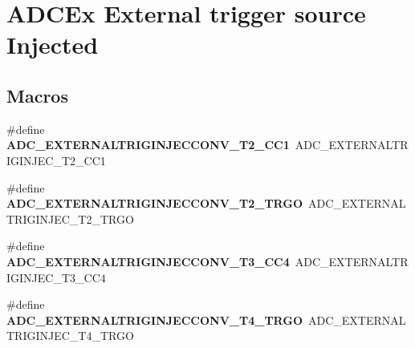 \hypertarget{group___a_d_c_ex___external__trigger__source___injected}{\section{A\-D\-C\-Ex External trigger source Injected}
\label{group___a_d_c_ex___external__trigger__source___injected}
}
\subsection*{Macros}
\begin{DoxyCompactItemize}
\item 
\hypertarget{group___a_d_c_ex___external__trigger__source___injected_gaadc7ecf196e883d7375e299dde80a8fa}{\#define {\bfseries A\-D\-C\-\_\-\-E\-X\-T\-E\-R\-N\-A\-L\-T\-R\-I\-G\-I\-N\-J\-E\-C\-C\-O\-N\-V\-\_\-\-T2\-\_\-\-C\-C1}~A\-D\-C\-\_\-\-E\-X\-T\-E\-R\-N\-A\-L\-T\-R\-I\-G\-I\-N\-J\-E\-C\-\_\-\-T2\-\_\-\-C\-C1}\label{group___a_d_c_ex___external__trigger__source___injected_gaadc7ecf196e883d7375e299dde80a8fa}

\item 
\hypertarget{group___a_d_c_ex___external__trigger__source___injected_ga5408c05ebc9a0a16c08b0be0e79506dc}{\#define {\bfseries A\-D\-C\-\_\-\-E\-X\-T\-E\-R\-N\-A\-L\-T\-R\-I\-G\-I\-N\-J\-E\-C\-C\-O\-N\-V\-\_\-\-T2\-\_\-\-T\-R\-G\-O}~A\-D\-C\-\_\-\-E\-X\-T\-E\-R\-N\-A\-L\-T\-R\-I\-G\-I\-N\-J\-E\-C\-\_\-\-T2\-\_\-\-T\-R\-G\-O}\label{group___a_d_c_ex___external__trigger__source___injected_ga5408c05ebc9a0a16c08b0be0e79506dc}

\item 
\hypertarget{group___a_d_c_ex___external__trigger__source___injected_ga826c3989c8fe4861729fdb966ff07c2d}{\#define {\bfseries A\-D\-C\-\_\-\-E\-X\-T\-E\-R\-N\-A\-L\-T\-R\-I\-G\-I\-N\-J\-E\-C\-C\-O\-N\-V\-\_\-\-T3\-\_\-\-C\-C4}~A\-D\-C\-\_\-\-E\-X\-T\-E\-R\-N\-A\-L\-T\-R\-I\-G\-I\-N\-J\-E\-C\-\_\-\-T3\-\_\-\-C\-C4}\label{group___a_d_c_ex___external__trigger__source___injected_ga826c3989c8fe4861729fdb966ff07c2d}

\item 
\hypertarget{group___a_d_c_ex___external__trigger__source___injected_ga87a5534698643b2c3872efb7d17d4f44}{\#define {\bfseries A\-D\-C\-\_\-\-E\-X\-T\-E\-R\-N\-A\-L\-T\-R\-I\-G\-I\-N\-J\-E\-C\-C\-O\-N\-V\-\_\-\-T4\-\_\-\-T\-R\-G\-O}~A\-D\-C\-\_\-\-E\-X\-T\-E\-R\-N\-A\-L\-T\-R\-I\-G\-I\-N\-J\-E\-C\-\_\-\-T4\-\_\-\-T\-R\-G\-O}\label{group___a_d_c_ex___external__trigger__source___injected_ga87a5534698643b2c3872efb7d17d4f44}


\end{DoxyCompactItemize}
